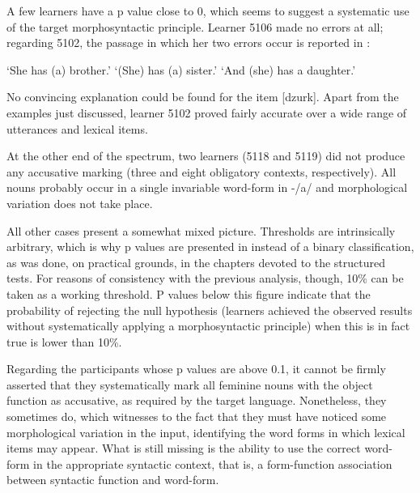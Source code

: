 A few learners have a p value close to 0, which seems to suggest a systematic use of the target morphosyntactic principle. Learner 5106 made no errors at all; regarding 5102, the passage in which her two errors occur is reported in :

\ea%
    \label{ex:07:8}
    \ea{\label{ex:07:8a}
    \gll    [ɔna   ɔn   ma  brat-a].\\
            \hspaceThis{[}she  he  has  brother-\textsc{acc}\\}
    \glt    ‘She has (a) brother.’
    \ex{\label{ex:07:8b}
    \gll    [ma   siostr-a].\\
            \hspaceThis{[}has  sister-\textsc{nom}\\}
    \glt    ‘(She) has (a) sister.’
    \ex{\label{ex:07:8c}
    \gll    [i  ma  dzurk].\\
            \hspaceThis{[}and  has  daughter.?\\}
    \glt    ‘And (she) has a daughter.’
    \z
\z

No convincing explanation could be found for the item [dzurk]. Apart from the examples just discussed, learner 5102 proved fairly accurate over a wide range of utterances and lexical items. 

At the other end of the spectrum, two learners (5118 and 5119) did not produce any accusative marking (three and eight obligatory contexts, respectively). All nouns probably occur in a single invariable word-form in -/a/ and morphological variation does not take place.

All other cases present a somewhat mixed picture. Thresholds are intrinsically arbitrary, which is why p values are presented in  instead of a binary classification, as was done, on practical grounds, in the chapters devoted to the structured tests. For reasons of consistency with the previous analysis, though, 10\% can be taken as a working threshold. P values below this figure indicate that the probability of rejecting the null hypothesis (learners achieved the observed results without systematically applying a morphosyntactic principle) when this is in fact true is lower than 10\%.

Regarding the participants whose p values are above 0.1, it cannot be firmly asserted that they systematically mark all feminine nouns with the object function as accusative, as required by the target language. Nonetheless, they sometimes do, which witnesses to the fact that they must have noticed some morphological variation in the input, identifying the word forms in which lexical items may appear. What is still missing is the ability to use the correct word-form in the appropriate syntactic context, that is, a form-function association between syntactic function and word-form. 

